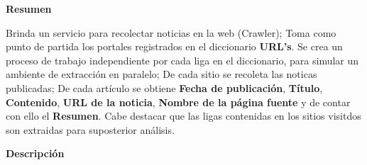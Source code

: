 
\begin{large}
	\textbf{Resumen}\\
\end{large}

Brinda un servicio para recolectar noticias en la web (Crawler); Toma como punto de partida los portales registrados en el diccionario \textbf{URL's}. Se crea un proceso de trabajo independiente por cada liga en el diccionario, para simular un ambiente de extracción en paralelo; De cada sitio se recoleta las noticas publicadas; De cada artículo se obtiene \textbf{Fecha de publicación}, \textbf{Título}, \textbf{Contenido}, \textbf{URL de la noticia}, \textbf{Nombre de la página fuente} y de contar con ello el \textbf{Resumen}. Cabe destacar que las ligas contenidas en los sitios visitdos son extraidas para suposterior análisis.\\

\begin{large}
	\textbf{Descripción}\\
\end{large} 


